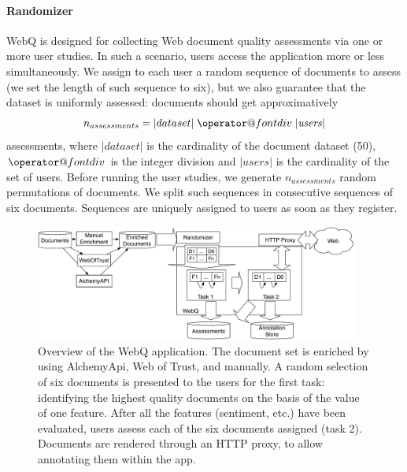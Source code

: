 \documentclass{llncs}
\makeatletter
\newcommand*{\bdiv}{%
  \nonscript\mskip-\medmuskip\mkern5mu%
  \mathbin{\operator@font div}\penalty900\mkern5mu%
  \nonscript\mskip-\medmuskip
}
\makeatother
\begin{document}
\paragraph{Randomizer}
WebQ is designed for collecting Web document quality assessments via one or more user studies. In such a scenario, users access the application more or less simultaneously. We assign to each user a random sequence of documents to assess (we set the length of such sequence to six), but we also guarantee that the dataset is uniformly assessed: documents should get approximatively $$ n_{assessments} = |dataset |  \bdiv | {\it users} | $$ assessments, where $| dataset|$ is the cardinality of the document dataset (50), $\bdiv$ is the integer division and $| {users}|$ is the cardinality of the set of users. 
Before running the user studies, we generate $n_{assessments}$ random permutations of documents. We split such sequences in consecutive sequences of six documents. Sequences are uniquely assigned to users as soon as they register.

\begin{figure}
\centering
\includegraphics[width=0.95\textwidth]{overview.pdf}
\caption{Overview of the WebQ application. The document set is enriched by using AlchemyApi, Web of Trust, and manually. A random selection of six documents is presented to the users for the first task: identifying the highest quality documents on the basis of the value of one feature. After all the features (sentiment, etc.) have been evaluated, users assess each of the six documents assigned (task 2). Documents are rendered through an HTTP proxy, to allow annotating them within the app.\label{fig:overview}}
\end{figure}
\end{document}
